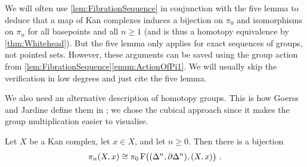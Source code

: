 \begin{rem}\label{rem:ExactnessInLowDegrees}
	We will often use \cref{lem:FibrationSequence} in conjunction with the five lemma to deduce that a map of Kan complexes induces a bijection on $\pi_0$ and isomorphisms on $\pi_n$ for all basepoints and all $n\geqslant 1$ (and is thus a homotopy equivalence by \cref{thm:Whitehead}). But the five lemma only applies for exact sequences of groups, not pointed sets. However, these arguments can be saved using the group action from \cref{lem:FibrationSequence}\cref{enum:ActionOfPi1}. We will usually skip the verification in low degrees and just cite the five lemma.
\end{rem}
We also need an alternative description of homotopy groups. This is how Goerss and Jardine define them in \cite[\S \href{http://dodo.pdmi.ras.ru/~topology/books/goerss-jardine.pdf\#page=37}{I.7}]{GoerssJardine}; we chose the cubical approach since it makes the group multiplication easier to visualise.
\begin{lem}\label{lem:HomotopyGroupsSimplex}
	Let $X$ be a Kan complex, let $x\in X$, and let $n\geqslant 0$. Then there is a bijection
	\begin{equation*}
		\pi_n(X,x)\cong \pi_0\F\lef((\Delta^n,\partial\Delta^n),(X,x)\righ)\,.
	\end{equation*}
\end{lem}
